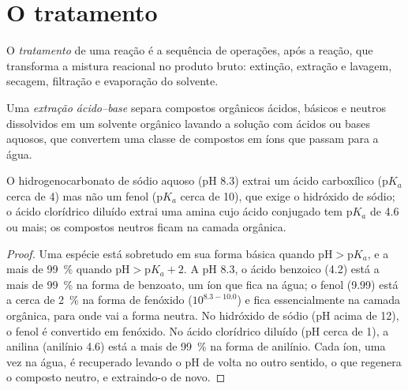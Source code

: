 \section{O tratamento}

\begin{definition}[Tratamento]\label{def:b2:lab-techniques-2:work-up}
O \emph{tratamento} de uma reação é a sequência de operações, após a reação, que
transforma a mistura reacional no produto bruto: extinção, extração e lavagem, secagem, filtração e
evaporação do solvente.
\end{definition}

\begin{definition}\label{def:b2:lab-techniques-2:acid-base-extraction}
Uma \emph{extração ácido--base} separa compostos orgânicos ácidos, básicos e
neutros dissolvidos em um solvente orgânico lavando a solução com ácidos ou bases aquosos, que
convertem uma classe de compostos em íons que passam para a água.
\end{definition}

\begin{proposition}\label{prop:b2:lab-techniques-2:acid-base-extraction}
O hidrogenocarbonato de sódio aquoso (pH 8.3) extrai um ácido carboxílico ($\mathrm pK_a$ cerca de 4) mas
não um fenol ($\mathrm pK_a$ cerca de 10), que exige o hidróxido de sódio; o ácido clorídrico diluído
extrai uma amina cujo ácido conjugado tem $\mathrm pK_a$ de 4.6 ou mais; os compostos neutros ficam na
camada orgânica.
\end{proposition}

\begin{proof}
Uma espécie está sobretudo em sua forma básica quando $\mathrm{pH} > \mathrm pK_a$, e a mais de 99~\%
quando $\mathrm{pH} > \mathrm pK_a + 2$. A pH 8.3, o ácido benzoico (4.2) está a mais de 99~\% na forma
de benzoato, um íon que fica na água; o fenol (9.99) está a cerca de 2~\% na forma de fenóxido
($10^{8.3 - 10.0}$) e fica essencialmente na camada orgânica, para onde vai a forma neutra. No hidróxido
de sódio (pH acima de 12), o fenol é convertido em fenóxido. No ácido clorídrico diluído (pH cerca de 1),
a anilina (anilínio 4.6) está a mais de 99~\% na forma de anilínio. Cada íon, uma vez na água, é
recuperado levando o pH de volta no outro sentido, o que regenera o composto neutro, e extraindo-o de novo.
\end{proof}

